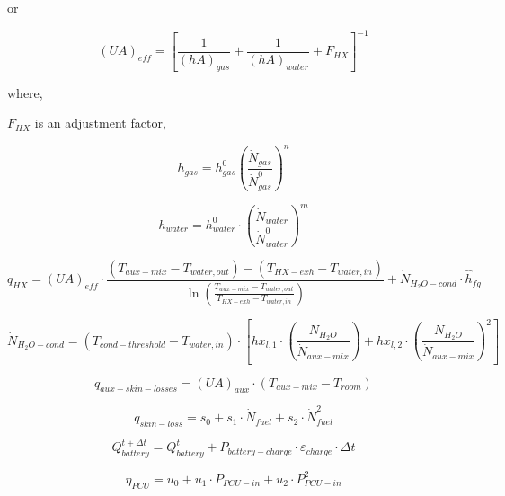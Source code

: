 or

\begin{equation}
{\left( {UA} \right)_{eff}} = {\left[ {\frac{1}{{{{\left( {hA} \right)}_{gas}}}} + \frac{1}{{{{(hA)}_{water}}}} + {F_{HX}}} \right]^{ - 1}}
\end{equation}

where,

\(F_{HX}\) is an adjustment factor,

\begin{equation}
h_{gas} = h_{gas}^0 \left( \frac{\dot{N}_{gas}}{\dot{N}_{gas}^0} \right)^n
\end{equation}

\begin{equation}
{h_{water}} = h_{water}^0 \cdot {\left( {\frac{{{{\dot N}_{water}}}}{{\dot N_{water}^0}}} \right)^m}
\end{equation}

\begin{equation}
{q_{HX}} = {\left( {UA} \right)_{eff}} \cdot \frac{{\left( {{T_{aux - mix}} - {T_{water,out}}} \right) - \left( {{T_{HX - exh}} - {T_{water,in}}} \right)}}{{\ln \left( {\frac{{{T_{aux - mix}} - {T_{water,out}}}}{{{T_{HX - exh}} - {T_{water,in}}}}} \right)}} + {\dot N_{{H_2}O - cond}} \cdot {\hat h_{fg}}
\end{equation}

\begin{equation}
{\dot N_{{H_2}O - cond}} = \left( {{T_{cond - threshold}} - {T_{water,in}}} \right) \cdot \left[ {h{x_{l,1}} \cdot \left( {\frac{{{{\dot N}_{{H_2}O}}}}{{{{\dot N}_{aux - mix}}}}} \right) + h{x_{l,2}} \cdot {{\left( {\frac{{{{\dot N}_{{H_2}O}}}}{{{{\dot N}_{aux - mix}}}}} \right)}^2}} \right]
\end{equation}

\begin{equation}
{q_{aux - skin - losses}} = {(UA)_{aux}} \cdot ({T_{aux - mix}} - {T_{room}})
\end{equation}

\begin{equation}
{q_{skin - loss}} = {s_0} + {s_1} \cdot {\dot N_{fuel}} + {s_2} \cdot \dot N_{fuel}^2
\end{equation}

\begin{equation}
Q_{battery}^{t + \Delta t} = Q_{battery}^t + {P_{battery - charge}} \cdot {\varepsilon_{charge}} \cdot \Delta t
\end{equation}

\begin{equation}
{\eta_{PCU}} = {u_0} + {u_1} \cdot {P_{PCU - in}} + {u_2} \cdot P_{PCU - in}^2
\end{equation}

